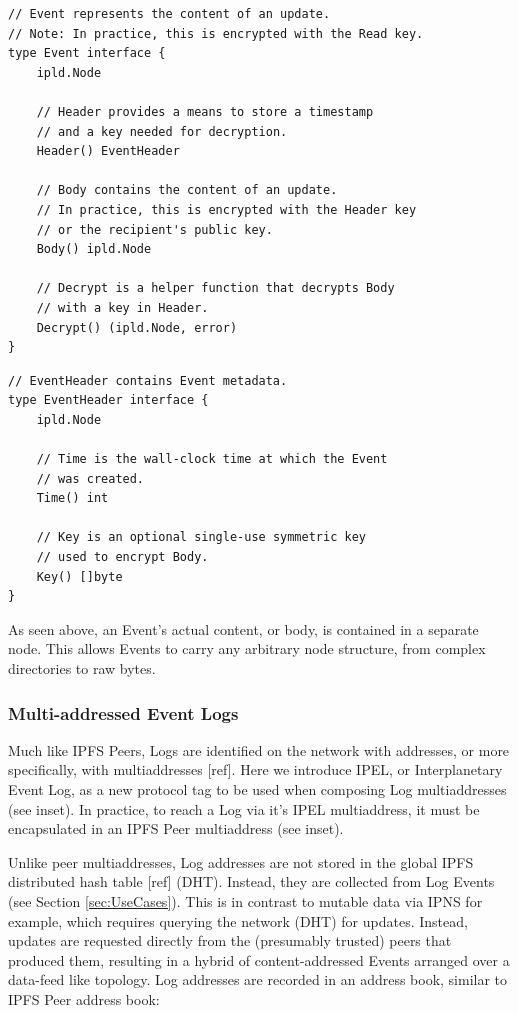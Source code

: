 \documentclass{comjnl}
\begin{document}
\begin{lstlisting}
// Event represents the content of an update.
// Note: In practice, this is encrypted with the Read key.
type Event interface {
    ipld.Node

    // Header provides a means to store a timestamp
    // and a key needed for decryption.
    Header() EventHeader

    // Body contains the content of an update.
    // In practice, this is encrypted with the Header key
    // or the recipient's public key.
    Body() ipld.Node

    // Decrypt is a helper function that decrypts Body
    // with a key in Header.
    Decrypt() (ipld.Node, error)
}
\end{lstlisting}
\begin{lstlisting}
// EventHeader contains Event metadata.
type EventHeader interface {
    ipld.Node

    // Time is the wall-clock time at which the Event
    // was created.
    Time() int

    // Key is an optional single-use symmetric key
    // used to encrypt Body.
    Key() []byte
}
\end{lstlisting}

As seen above, an Event’s actual content, or body, is contained in a separate node. This allows Events to carry any arbitrary node structure, from complex directories to raw bytes.

\subsubsection{Multi-addressed Event Logs}

Much like IPFS Peers, Logs are identified on the network with addresses, or more specifically, with multiaddresses [ref]. Here we introduce IPEL, or Interplanetary Event Log, as a new protocol tag to be used when composing Log multiaddresses (see inset). In practice, to reach a Log via it’s IPEL multiaddress, it must be encapsulated in an IPFS Peer multiaddress (see inset).

Unlike peer multiaddresses, Log addresses are not stored in the global IPFS distributed hash table [ref] (DHT). Instead, they are collected from Log Events (see Section  \ref{sec:UseCases}). This is in contrast to mutable data via IPNS for example, which requires querying the network (DHT) for updates. Instead, updates are requested directly from the (presumably trusted) peers that produced them, resulting in a hybrid of content-addressed Events arranged over a data-feed like topology. Log addresses are recorded in an address book, similar to IPFS Peer address book:
\end{document}
